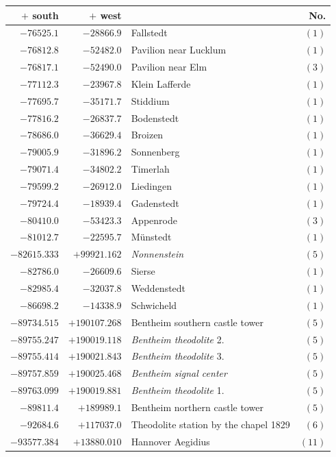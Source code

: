 \clearpage
\begin{center}\begingroup\fontsize{8}{9}\selectfont
\setlength{\tabcolsep}{4pt}
\begin{tabular}{r|r|p{170pt}|r}\hline
\(+\) south&\(+\) west&&No.\\\hline
\(-76525.1\)&\(-28866.9\)&Fallstedt&\((1)\)\\
\(-76812.8\)&\(-52482.0\)&Pavilion near Lucklum&\((1)\)\\
\(-76817.1\)&\(-52490.0\)&Pavilion near Elm&\((3)\)\\
\(-77112.3\)&\(-23967.8\)&Klein Lafferde&\((1)\)\\
\(-77695.7\)&\(-35171.7\)&Stiddium&\((1)\)\\
\(-77816.2\)&\(-26837.7\)&Bodenstedt&\((1)\)\\
\(-78686.0\)&\(-36629.4\)&Broizen&\((1)\)\\
\(-79005.9\)&\(-31896.2\)&Sonnenberg&\((1)\)\\
\(-79071.4\)&\(-34802.2\)&Timerlah&\((1)\)\\
\(-79599.2\)&\(-26912.0\)&Liedingen&\((1)\)\\
\(-79724.4\)&\(-18939.4\)&Gadenstedt&\((1)\)\\
\(-80410.0\)&\(-53423.3\)&Appenrode&\((3)\)\\
\(-81012.7\)&\(-22595.7\)&Münstedt&\((1)\)\\
\(-82615.333\)&\(+99921.162\)&\textit{Nonnenstein}&\((5)\)\\
\(-82786.0\)&\(-26609.6\)&Sierse&\((1)\)\\
\(-82985.4\)&\(-32037.8\)&Weddenstedt&\((1)\)\\
\(-86698.2\)&\(-14338.9\)&Schwicheld&\((1)\)\\
\(-89734.515\)&\(+190107.268\)&Bentheim southern castle tower&\((5)\)\\
\(-89755.247\)&\(+190019.118\)&\textit{Bentheim theodolite} 2.&\((5)\)\\
\(-89755.414\)&\(+190021.843\)&\textit{Bentheim theodolite} 3.&\((5)\)\\
\(-89757.859\)&\(+190025.468\)&\textit{Bentheim signal center}&\((5)\)\\
\(-89763.099\)&\(+190019.881\)&\textit{Bentheim theodolite} 1.&\((5)\)\\
\(-89811.4\)&\(+189989.1\)&Bentheim northern castle tower&\((5)\)\\
\(-92684.6\)&\(+117037.0\)&Theodolite station by the chapel 1829&\((6)\)\\
\(-93577.384\)&\(+13880.010\)&Hannover Aegidius&\((11)\)\\

\end{tabular}
\end{center}
